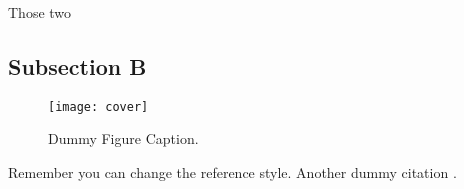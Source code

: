 Those two

\subsection{Subsection B}
\label{subsec:subbsectiona}

\begin{figure}[H]
  \centering
  \texttt{[image: cover]}
  \caption[Dummy Figure Caption for List of Figures.]{Dummy Figure Caption.}
  \label{fig:dummyfigure1}
\end{figure}

Remember you can change the reference style. Another dummy citation \cite{site}.
